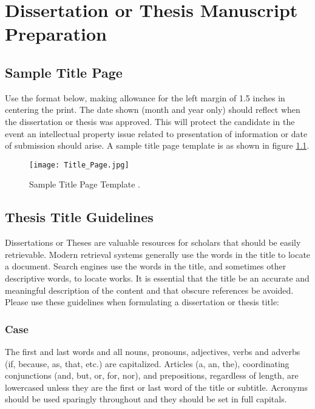 

\chapter{Dissertation or Thesis Manuscript Preparation}
\label{chapter2}

\section{Sample Title Page}

Use the format below, making allowance for the left margin of 1.5 inches in centering the print. The date shown (month and year only) should reflect when the dissertation or thesis was approved. This will protect the candidate in the event an intellectual property issue related to presentation of information or date of submission should arise. A sample title page template is as shown in figure \ref{title_page}.

\begin{figure}[H]
\begin{center}
\texttt{[image: Title\_Page.jpg]}
\caption{Sample Title Page Template \cite{guidelines}.}
\label{title_page}
\end{center}
\end{figure}

\section{Thesis Title Guidelines}

Dissertations or Theses are valuable resources for scholars that should be easily retrievable. Modern retrieval systems generally use the words in the title to locate a document. Search engines use the words in the title, and sometimes other descriptive words, to locate works. It is essential that the title be an accurate and meaningful description of the content and that obscure references be avoided. Please use these guidelines when formulating a dissertation or thesis title:

\subsection{Case}

The first and last words and all nouns, pronouns, adjectives, verbs and adverbs (if, because, as, that, etc.) are capitalized. Articles (a, an, the), coordinating conjunctions (and, but, or, for, nor), and prepositions, regardless of length, are lowercased unless they are the first or last word of the title or subtitle. Acronyms should be used sparingly throughout and they should be set in full capitals.

